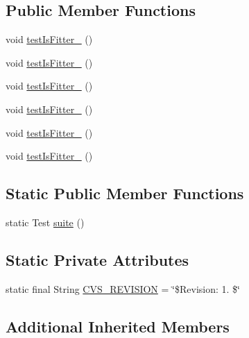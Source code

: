 \subsection*{Public Member Functions}
\begin{DoxyCompactItemize}
\item 
void \hyperlink{classorg_1_1jgap_1_1_default_fitness_evaluator_test_a6c30688ce129f8e69c78bb7d2740572e}{test\-Is\-Fitter\-\_} ()
\item 
void \hyperlink{classorg_1_1jgap_1_1_default_fitness_evaluator_test_af6cde7622bf3d3009a774101db3be32c}{test\-Is\-Fitter\-\_} ()
\item 
void \hyperlink{classorg_1_1jgap_1_1_default_fitness_evaluator_test_af01e6176b17e7953a21ca93eae3e70ee}{test\-Is\-Fitter\-\_} ()
\item 
void \hyperlink{classorg_1_1jgap_1_1_default_fitness_evaluator_test_ae84fd6816b2ac5e5e4dcac86cf8c5955}{test\-Is\-Fitter\-\_} ()
\item 
void \hyperlink{classorg_1_1jgap_1_1_default_fitness_evaluator_test_a5ef0d89635e7a4f3a51ffda74ef1c46e}{test\-Is\-Fitter\-\_} ()
\item 
void \hyperlink{classorg_1_1jgap_1_1_default_fitness_evaluator_test_a6e5c133714592b71d7441d7083f8b4e4}{test\-Is\-Fitter\-\_} ()
\end{DoxyCompactItemize}
\subsection*{Static Public Member Functions}
\begin{DoxyCompactItemize}
\item 
static Test \hyperlink{classorg_1_1jgap_1_1_default_fitness_evaluator_test_aabbb3dcfa92207bb81ea51c4d98b6ac8}{suite} ()
\end{DoxyCompactItemize}
\subsection*{Static Private Attributes}
\begin{DoxyCompactItemize}
\item 
static final String \hyperlink{classorg_1_1jgap_1_1_default_fitness_evaluator_test_affb1fb6eeee86dbc5d9f4ac21fed9b85}{C\-V\-S\-\_\-\-R\-E\-V\-I\-S\-I\-O\-N} = \char`\"{}\$Revision\-: 1. \$\char`\"{}
\end{DoxyCompactItemize}
\subsection*{Additional Inherited Members}


